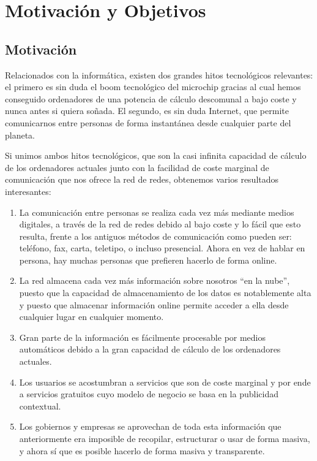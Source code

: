 \chapter{Motivación y Objetivos}\label{defobjetivos}
\section{Motivación}\label{motivacion}

Relacionados con la informática, existen dos grandes hitos tecnológicos relevantes: el primero es sin duda el boom tecnológico del microchip gracias al cual hemos conseguido ordenadores de una potencia de cálculo descomunal a bajo coste y nunca antes si quiera soñada. El segundo, es sin duda Internet, que permite comunicarnos entre personas de forma instantánea desde cualquier parte del planeta.

Si unimos ambos hitos tecnológicos, que son la casi infinita capacidad de cálculo de los ordenadores actuales junto con la facilidad de coste marginal de comunicación que nos ofrece la red de redes, obtenemos varios resultados interesantes:

\begin{enumerate}
 \item La comunicación entre personas se realiza cada vez más mediante medios digitales, a través de la red de redes debido al bajo coste y lo fácil que esto resulta, frente a los antiguos métodos de comunicación como pueden ser: teléfono, fax, carta, teletipo, o incluso presencial. Ahora en vez de hablar en persona, hay muchas personas que prefieren hacerlo de forma online.
 \item La red almacena cada vez más información sobre nosotros ``en la nube'', puesto que la capacidad de almacenamiento de los datos es notablemente alta y puesto que almacenar información online permite acceder a ella desde cualquier lugar en cualquier momento.
 \item Gran parte de la información es fácilmente procesable por medios automáticos debido a la gran capacidad de cálculo de los ordenadores actuales.
 \item Los usuarios se acostumbran a servicios que son de coste marginal y por ende a servicios gratuitos cuyo modelo de negocio se basa en la publicidad contextual.
 \item Los gobiernos y empresas se aprovechan de toda esta información que anteriormente era imposible de recopilar, estructurar o usar de forma masiva, y ahora sí que es posible hacerlo de forma masiva y transparente.
\end{enumerate}


